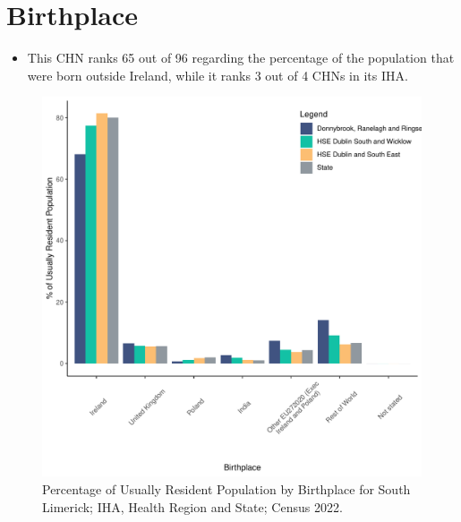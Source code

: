 \documentclass{article}
\begin{document}
\section{Birthplace}\label{sect:Birth}
\begin{itemize}
\item This CHN ranks  65 out of 96 regarding the percentage of the population that were born outside Ireland, while it ranks  3 out of 4 CHNs in its IHA.
\end{itemize}
\begin{figure}[H]
	\centering
	\includegraphics[width = 130mm]{../figures/BirthED.pdf}
	\caption{Percentage of Usually Resident Population by Birthplace for South Limerick; IHA, Health Region and State; Census 2022.}
	\label{fig:vbnv}
	\end{figure}
	
\end{document}

